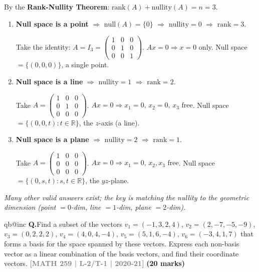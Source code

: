 \documentclass[12pt,a3paper]{article}
\makeatletter
\newcommand{\yr}[1]{\hfill\textcolor{gray}{\small\textbf{[#1]}}}
\newcommand{\mk}[1]{\textcolor{orange!70!black}{\small\textbf{(#1 marks)}}}
\newcounter{qnum}
\newcommand{\Q}[1]{%
  \csname qb@inc\endcsname
  \needspace{4\baselineskip}
  \refstepcounter{qnum}
  \vspace{6pt}
  \noindent\textbf{Q\theqnum.}\enspace #1\par
}
\makeatother
\begin{document}
\begin{tcolorbox}[enhanced,breakable,colback=cC!4,colframe=cC,
  boxrule=0.8pt,arc=5pt,
  title={\textbf{Answer}},
  fonttitle=\bfseries\color{white},colbacktitle=cC]

By the \textbf{Rank-Nullity Theorem}: $\mathrm{rank}(A)+\mathrm{nullity}(A)=n=3$.

\begin{enumerate}[label=(\roman*)]
  \item \textbf{Null space is a point} $\Rightarrow$ $\mathrm{null}(A)=\{0\}$ $\Rightarrow$ $\mathrm{nullity}=0$ $\Rightarrow$ $\mathrm{rank}=3$.

  Take the identity: $A=I_3=\begin{pmatrix}1&0&0\\0&1&0\\0&0&1\end{pmatrix}$.
  $Ax=0\Rightarrow x=0$ only. Null space $=\{(0,0,0)\}$, a single point. \checkmark

  \item \textbf{Null space is a line} $\Rightarrow$ $\mathrm{nullity}=1$ $\Rightarrow$ $\mathrm{rank}=2$.

  Take $A=\begin{pmatrix}1&0&0\\0&1&0\\0&0&0\end{pmatrix}$.
  $Ax=0\Rightarrow x_1=0,\,x_2=0,\,x_3\text{ free}$.
  Null space $=\{(0,0,t):t\in\mathbb{R}\}$, the $z$-axis (a line). \checkmark

  \item \textbf{Null space is a plane} $\Rightarrow$ $\mathrm{nullity}=2$ $\Rightarrow$ $\mathrm{rank}=1$.

  Take $A=\begin{pmatrix}1&0&0\\0&0&0\\0&0&0\end{pmatrix}$.
  $Ax=0\Rightarrow x_1=0,\,x_2,x_3\text{ free}$.
  Null space $=\{(0,s,t):s,t\in\mathbb{R}\}$, the $yz$-plane. \checkmark
\end{enumerate}

\textit{Many other valid answers exist; the key is matching the nullity to the geometric dimension (point $=0$-dim, line $=1$-dim, plane $=2$-dim).}
\end{tcolorbox}

\Q{Find a subset of the vectors $v_1 = (-1,3,2,4)$, $v_2 = (2,-7,-5,-9)$, $v_3 = (0,2,2,2)$, $v_4 = (4,0,4,-4)$, $v_5 = (5,1,6,-4)$, $v_6 = (-3,4,1,7)$ that forms a basis for the space spanned by these vectors. Express each non-basis vector as a linear combination of the basis vectors, and find their coordinate vectors.
\yr{MATH 259 | L-2/T-1 | 2020-21} \mk{20}}
\end{document}
